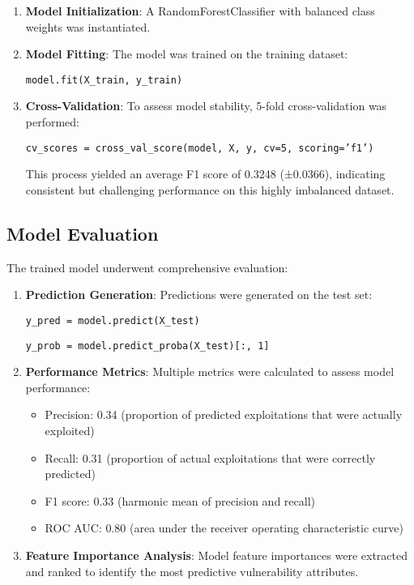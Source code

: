 \documentclass[runningheads]{llncs}
\begin{document}
\begin{enumerate}
    \item \textbf{Model Initialization}: A RandomForestClassifier with balanced class weights was instantiated.
    
    \item \textbf{Model Fitting}: The model was trained on the training dataset:
    
    \texttt{model.fit(X\_train, y\_train)}
    
    \item \textbf{Cross-Validation}: To assess model stability, 5-fold cross-validation was performed:
    
    \texttt{cv\_scores = cross\_val\_score(model, X, y, cv=5, scoring='f1')}
    
    This process yielded an average F1 score of 0.3248 (±0.0366), indicating consistent but challenging performance on this highly imbalanced dataset.
\end{enumerate}

\subsection{Model Evaluation}
The trained model underwent comprehensive evaluation:

\begin{enumerate}
    \item \textbf{Prediction Generation}: Predictions were generated on the test set:
    
    \texttt{y\_pred = model.predict(X\_test)}
    
    \texttt{y\_prob = model.predict\_proba(X\_test)[:, 1]}
    
    \item \textbf{Performance Metrics}: Multiple metrics were calculated to assess model performance:
    \begin{itemize}
        \item Precision: 0.34 (proportion of predicted exploitations that were actually exploited)
        \item Recall: 0.31 (proportion of actual exploitations that were correctly predicted)
        \item F1 score: 0.33 (harmonic mean of precision and recall)
        \item ROC AUC: 0.80 (area under the receiver operating characteristic curve)
    \end{itemize}
    
    \item \textbf{Feature Importance Analysis}: Model feature importances were extracted and ranked to identify the most predictive vulnerability attributes.
\end{enumerate}
\end{document}
